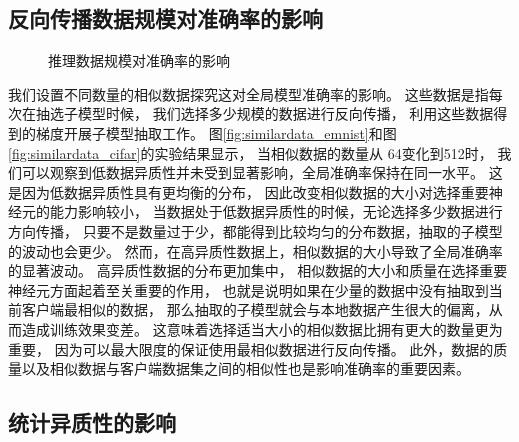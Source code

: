 \subsection{反向传播数据规模对准确率的影响}
\begin{figure}[thbp]
    \label{fig:rho}
    \centering
      \hfill
         \caption{  
            推理数据规模对准确率的影响
      }
\end{figure}
我们设置不同数量的相似数据探究这对全局模型准确率的影响。
这些数据是指每次在抽选子模型时候，
我们选择多少规模的数据进行反向传播，
利用这些数据得到的梯度开展子模型抽取工作。
图\ref{fig:similardata_emnist}和图\ref{fig:similardata_cifar}的实验结果显示，
当相似数据的数量从
64变化到512时，
我们可以观察到低数据异质性并未受到显著影响，全局准确率保持在同一水平。
这是因为低数据异质性具有更均衡的分布，
因此改变相似数据的大小对选择重要神经元的能力影响较小，
当数据处于低数据异质性的时候，无论选择多少数据进行方向传播，
只要不是数量过于少，都能得到比较均匀的分布数据，抽取的子模型的波动也会更少。
然而，在高异质性数据上，相似数据的大小导致了全局准确率的显著波动。
高异质性数据的分布更加集中，
相似数据的大小和质量在选择重要神经元方面起着至关重要的作用，
也就是说明如果在少量的数据中没有抽取到当前客户端最相似的数据，
那么抽取的子模型就会与本地数据产生很大的偏离，从而造成训练效果变差。
这意味着选择适当大小的相似数据比拥有更大的数量更为重要，
因为可以最大限度的保证使用最相似数据进行反向传播。
此外，数据的质量以及相似数据与客户端数据集之间的相似性也是影响准确率的重要因素。

\subsection{统计异质性的影响}

